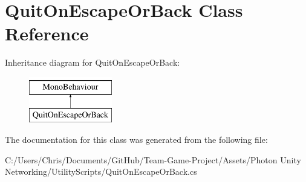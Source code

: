 \hypertarget{class_quit_on_escape_or_back}{}\section{Quit\+On\+Escape\+Or\+Back Class Reference}
\label{class_quit_on_escape_or_back}
Inheritance diagram for Quit\+On\+Escape\+Or\+Back\+:\begin{figure}[H]
\begin{center}
\leavevmode
\includegraphics[height=2.000000cm]{class_quit_on_escape_or_back}
\end{center}
\end{figure}


The documentation for this class was generated from the following file\+:\begin{DoxyCompactItemize}
\item 
C\+:/\+Users/\+Chris/\+Documents/\+Git\+Hub/\+Team-\/\+Game-\/\+Project/\+Assets/\+Photon Unity Networking/\+Utility\+Scripts/Quit\+On\+Escape\+Or\+Back.\+cs\end{DoxyCompactItemize}
